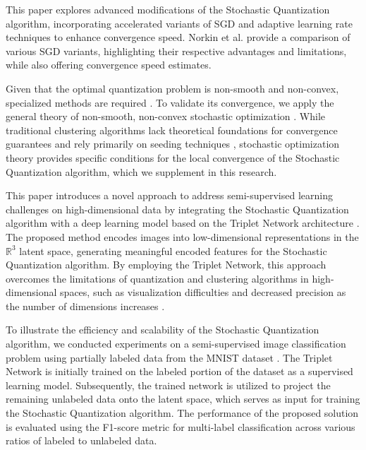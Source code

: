 This paper explores advanced modifications of the Stochastic Quantization algorithm, incorporating accelerated variants of SGD \cite{nesterov1983method,Poliak_1987,walkington_2023} and adaptive learning rate techniques \cite{Duchi_2011,kingma2017adam,tieleman2012rmsprop} to enhance convergence speed. Norkin et al. \cite{Norkin_Kozyriev_Norkin_2024} provide a comparison of various SGD variants, highlighting their respective advantages and limitations, while also offering convergence speed estimates.

Given that the optimal quantization problem is non-smooth and non-convex, specialized methods are required \cite{Gandikota_Kane_Maity_Mazumdar_2022,Tang_2017,Zhao_Lan_Chen_Ngo_2021}. To validate its convergence, we apply the general theory of non-smooth, non-convex stochastic optimization \cite{Ermoliev_Norkin_2003,Ermolev_Norkin_1998,mikhalevich2024}. While traditional clustering algorithms lack theoretical foundations for convergence guarantees and rely primarily on seeding techniques \cite{Arthur_Vassilvitskii_2007}, stochastic optimization theory provides specific conditions for the local convergence of the Stochastic Quantization algorithm, which we supplement in this research.

This paper introduces a novel approach to address semi-supervised learning challenges on high-dimensional data by integrating the Stochastic Quantization algorithm with a deep learning model based on the Triplet Network architecture \cite{Hoffer_2015}. The proposed method encodes images into low-dimensional representations in the $\mathbb{R}^3$ latent space, generating meaningful encoded features for the Stochastic Quantization algorithm. By employing the Triplet Network, this approach overcomes the limitations of quantization and clustering algorithms in high-dimensional spaces, such as visualization difficulties and decreased precision as the number of dimensions increases \cite{Kriegel_Kröger_Zimek_2009}.

To illustrate the efficiency and scalability of the Stochastic Quantization algorithm, we conducted experiments on a semi-supervised image classification problem using partially labeled data from the MNIST dataset \cite{lecun2010mnist}. The Triplet Network is initially trained on the labeled portion of the dataset as a supervised learning model. Subsequently, the trained network is utilized to project the remaining unlabeled data onto the latent space, which serves as input for training the Stochastic Quantization algorithm. The performance of the proposed solution is evaluated using the F1-score metric \cite{Chinchor_1992} for multi-label classification across various ratios of labeled to unlabeled data.
